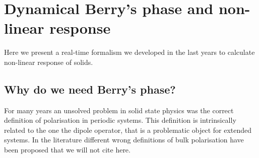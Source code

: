 \section{Dynamical Berry's phase and non-linear response} 
\label{chapterberry}
Here we present a real-time formalism we developed in the last years to calculate non-linear response of solids.
\subsection{Why do we need Berry's phase?}
For many years an unsolved problem in solid state physics was the correct definition of polarisation in periodic systems.
This definition is intrinsically related to the one the dipole operator, that is a problematic object for extended systems.
In the literature different wrong definitions of bulk polarisation have been proposed that we will not cite here\cite{restanotes}.
\label{polisolated}
